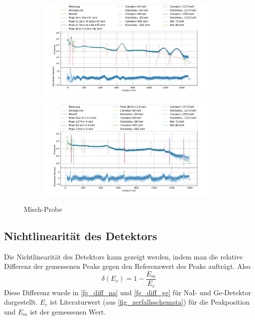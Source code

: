 \documentclass[
	a4paper,
	12pt,
	pagesize,
	ngerman
]{scrartcl}
\begin{document}
\begin{figure}[H]
		\centering
		\begin{subfigure}[c]{\textwidth}
			\centering
			\includegraphics[width= 1 \linewidth]{img/MixNa.pdf}
		\label{fg_Mix_Na}
		\end{subfigure}
		\begin{subfigure}[c]{\textwidth}
			\centering
			\includegraphics[width= 1 \linewidth]{img/MixGe.pdf}
		\label{fg_Mix_Ge}
		\end{subfigure}
		\caption{Misch-Probe}
		\label{fg_Mix}
	\end{figure}


\subsection{Nichtlinearität des Detektors}
Die Nichtlinearität des Detektors kann gezeigt werden, indem man die relative Differenz der gemessenen Peaks gegen den Referenzwert des Peaks aufträgt.
Also
\begin{equation}
	\delta(E_r) = 1- \frac{E_m}{E_r}
\end{equation}
Diese Differenz wurde  in \cref{fg_diff_na} und \cref{fg_diff_ge} für NaI- und Ge-Detektor dargestellt.
$E_r$ ist Literaturwert (aus \cref{fig_zerfallsschemata}) für die Peakposition und $E_m$ ist der gemessenen Wert.
\end{document}
